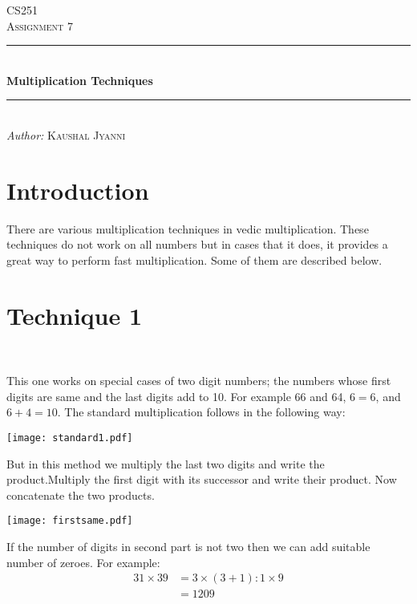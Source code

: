 \documentclass[]{article}
\begin{document}
\begin{titlepage}
\center
\newcommand{\HRule}{\rule{\linewidth}{0.5mm}}
\textsc{\LARGE CS251}\\[0.5cm]
\textsc{\Large Assignment 7}\\[0.5cm]
\HRule \\[0.4cm]
{ \huge \bfseries Multiplication Techniques}\\	 %
\HRule \\[1.5cm]
\large\emph{Author:}
\textsc{Kaushal Jyanni}\\
\end{titlepage}

\section{Introduction}
There are various multiplication techniques in vedic multiplication. These techniques do not work on all numbers but in cases that it does, it provides a great way to perform fast multiplication. Some of them are described  below.

\section{Technique 1}~\cite{wiki}

This one works on special cases of two digit numbers; the numbers whose first digits are same and the last digits add to 10. For example 66 and 64, $6=6$, and $6+4=10$. The standard multiplication follows in the following way:\\
\begin{center}\texttt{[image: standard1.pdf]}\end{center}
But in this method we multiply the last two digits and write the product.Multiply the first digit with its successor and write their product. Now concatenate the two products.
\begin{center}\texttt{[image: firstsame.pdf]}\end{center}
If the number of digits in second part is not two then we can add suitable number of zeroes.
For example:\\
\begin{align*}
31 \times 39 &= 3\times(3+1):1\times9\\
&=1209\\
\end{align*}
\end{document}
